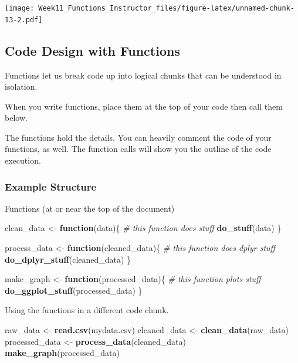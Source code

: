 \documentclass[
]{article}
\newenvironment{Shaded}{\begin{snugshade}}{\end{snugshade}}
\newcommand{\CommentTok}[1]{\textcolor[rgb]{0.56,0.35,0.01}{\textit{#1}}}
\newcommand{\ControlFlowTok}[1]{\textcolor[rgb]{0.13,0.29,0.53}{\textbf{#1}}}
\newcommand{\FunctionTok}[1]{\textcolor[rgb]{0.13,0.29,0.53}{\textbf{#1}}}
\newcommand{\NormalTok}[1]{#1}
\newcommand{\OtherTok}[1]{\textcolor[rgb]{0.56,0.35,0.01}{#1}}
\newcommand{\StringTok}[1]{\textcolor[rgb]{0.31,0.60,0.02}{#1}}
\begin{document}
\texttt{[image: Week11\_Functions\_Instructor\_files/figure-latex/unnamed-chunk-13-2.pdf]}

\subsection{Code Design with
Functions}\label{code-design-with-functions}

Functions let us break code up into logical chunks that can be
understood in isolation.

When you write functions, place them at the top of your code then call
them below.

The functions hold the details. You can heavily comment the code of your
functions, as well. The function calls will show you the outline of the
code execution.

\subsubsection{Example Structure}\label{example-structure}

Functions (at or near the top of the document)

\begin{Shaded}
\begin{Highlighting}[]
\NormalTok{clean\_data }\OtherTok{\textless{}{-}} \ControlFlowTok{function}\NormalTok{(data)\{}
  \CommentTok{\# this function does stuff}
  \FunctionTok{do\_stuff}\NormalTok{(data)}
\NormalTok{\}}

\NormalTok{process\_data }\OtherTok{\textless{}{-}} \ControlFlowTok{function}\NormalTok{(cleaned\_data)\{}
  \CommentTok{\# this function does dplyr stuff}
  \FunctionTok{do\_dplyr\_stuff}\NormalTok{(cleaned\_data)}
\NormalTok{\}}

\NormalTok{make\_graph }\OtherTok{\textless{}{-}} \ControlFlowTok{function}\NormalTok{(processed\_data)\{}
  \CommentTok{\# this function plots stuff}
  \FunctionTok{do\_ggplot\_stuff}\NormalTok{(processed\_data)}
\NormalTok{\}}
\end{Highlighting}
\end{Shaded}

Using the functions in a different code chunk.

\begin{Shaded}
\begin{Highlighting}[]
\NormalTok{raw\_data }\OtherTok{\textless{}{-}} \FunctionTok{read.csv}\NormalTok{(}\StringTok{\textquotesingle{}mydata.csv\textquotesingle{}}\NormalTok{)}
\NormalTok{cleaned\_data }\OtherTok{\textless{}{-}} \FunctionTok{clean\_data}\NormalTok{(raw\_data)}
\NormalTok{processed\_data }\OtherTok{\textless{}{-}} \FunctionTok{process\_data}\NormalTok{(cleaned\_data)}
\FunctionTok{make\_graph}\NormalTok{(processed\_data)}
\end{Highlighting}
\end{Shaded}
\end{document}
